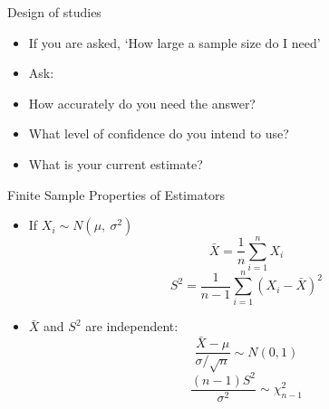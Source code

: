 \documentclass{beamer}
\numberwithin{equation}{section}
\begin{document}
\begin{frame}{Design of studies}
\begin{itemize}
\item If you are asked, `How large a sample size do I need'
\item Ask:
\item How accurately do you need the answer?
\item What level of confidence do you intend to use?
\item What is your current estimate?
\end{itemize}
\end{frame}

\begin{frame}{Finite Sample Properties of Estimators}
\begin{itemize}
\item If $X_i\sim N(\mu,\ \sigma^2)$ 
$$\bar{X}=\frac{1}{n}\sum_{i=1}^nX_i$$\pause
$$S^2=\frac{1}{n-1}\sum_{i=1}^n(X_i-\bar{X})^2$$\pause
\item $\bar{X}$ and $S^2$ are independent:
$$\frac{\bar{X}-\mu}{\sigma/\sqrt{n}}\sim N(0,1)$$\pause
$$\frac{(n-1)S^2}{\sigma^2}\sim \chi^2_{n-1}$$
\end{itemize}
\end{frame}
\end{document}
